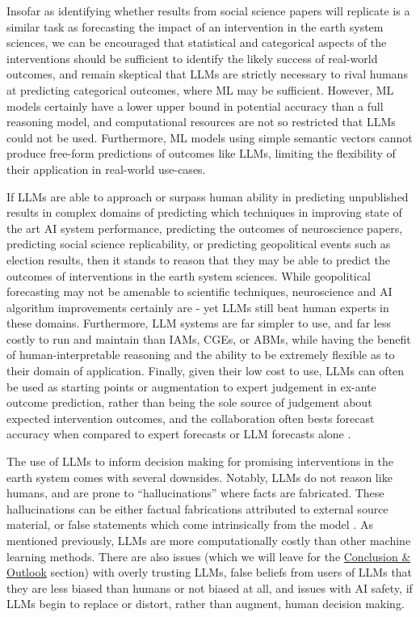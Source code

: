 \documentclass[12pt,a4paper]{article}
\begin{document}
Insofar as identifying whether results from social science papers will replicate is a similar task as forecasting the impact of an intervention in the earth system sciences, we can be encouraged that statistical and categorical aspects of the interventions should be sufficient to identify the likely success of real-world outcomes, and remain skeptical that LLMs are strictly necessary to rival humans at predicting categorical outcomes, where ML may be sufficient. However, ML models certainly have a lower upper bound in potential accuracy than a full reasoning model, and computational resources are not so restricted that LLMs could not be used. Furthermore, ML models using simple semantic vectors cannot produce free-form predictions of outcomes like LLMs, limiting the flexibility of their application in real-world use-cases.

If LLMs are able to approach or surpass human ability in predicting unpublished results in complex domains of predicting which techniques in improving state of the art AI system performance, predicting the outcomes of neuroscience papers, predicting social science replicability, or predicting geopolitical events such as election results, then it stands to reason that they may be able to predict the outcomes of interventions in the earth system sciences. While geopolitical forecasting may not be amenable to scientific techniques, neuroscience and AI algorithm improvements certainly are - yet LLMs still beat human experts in these domains. Furthermore, LLM systems are far simpler to use, and far less costly to run and maintain than IAMs, CGEs, or ABMs, while having the benefit of human-interpretable reasoning and the ability to be extremely flexible as to their domain of application. Finally, given their low cost to use, LLMs can often be used as starting points or augmentation to expert judgement in ex-ante outcome prediction, rather than being the sole source of judgement about expected intervention outcomes, and the collaboration often bests forecast accuracy when compared to expert forecasts or LLM forecasts alone  .

The use of LLMs to inform decision making for promising interventions in the earth system comes with several downsides. Notably, LLMs do not reason like humans, and are prone to ``hallucinations''  where facts are fabricated. These hallucinations can be either factual fabrications attributed to external source material, or false statements which come intrinsically from the model . As mentioned previously, LLMs are more computationally costly than other machine learning methods. There are also issues (which we will leave for the \hyperref[sec:conclusion_outlook]{Conclusion \& Outlook} section) with overly trusting LLMs, false beliefs from users of LLMs that they are less biased than humans or not biased at all, and issues with AI safety, if LLMs begin to replace or distort, rather than augment, human decision making.
\end{document}
